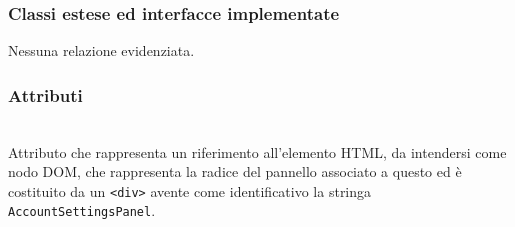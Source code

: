 \subsubsection*{Classi estese ed interfacce implementate}
Nessuna relazione evidenziata.

\subsubsection*{Attributi}
\begin{description}
\item{}\\
Attributo che rappresenta un riferimento all'elemento HTML, da intendersi come nodo DOM, che rappresenta la radice del pannello associato a questo  ed è costituito da un \verb'<div>' avente come identificativo la stringa \verb'AccountSettingsPanel'.
\end{description}

